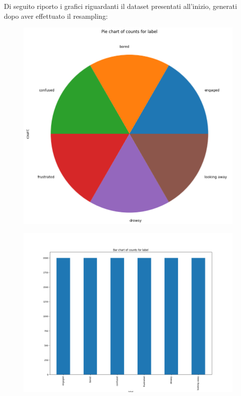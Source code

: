 Di seguito riporto i grafici riguardanti il dataset presentati all’inizio, generati dopo aver effettuato il resampling:
\begin{figure}
    \begin{center}    
        \includegraphics[width=1\linewidth]{images/image45.png}
    \end{center}
\end{figure}
\begin{figure}
    \begin{center}    
        \includegraphics[width=1\linewidth]{images/image46.png}
    \end{center}
\end{figure}